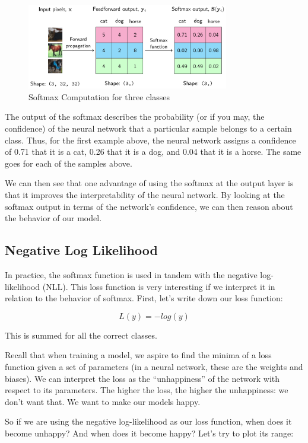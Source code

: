 \documentclass{report}
\begin{document}
\begin{figure}[ht]
	\includegraphics[width=250pt]{9}
	\centering
	\caption{Softmax Computation for three classes}
\end{figure}

The output of the softmax describes the probability (or if you may, the confidence) of the neural network that a particular sample belongs to a certain class. Thus, for the first example above, the neural network assigns a confidence of 0.71 that it is a cat, 0.26 that it is a dog, and 0.04 that it is a horse. The same goes for each of the samples above.

We can then see that one advantage of using the softmax at the output layer is that it improves the interpretability of the neural network. By looking at the softmax output in terms of the network’s confidence, we can then reason about the behavior of our model.

\subsection{Negative Log Likelihood}
In practice, the softmax function is used in tandem with the negative log-likelihood (NLL). This loss function is very interesting if we interpret it in relation to the behavior of softmax. First, let’s write down our loss function:

$$L(y) = -log(y)$$

This is summed for all the correct classes.

Recall that when training a model, we aspire to find the minima of a loss function given a set of parameters (in a neural network, these are the weights and biases). We can interpret the loss as the “unhappiness” of the network with respect to its parameters. The higher the loss, the higher the unhappiness: we don’t want that. We want to make our models happy.

So if we are using the negative log-likelihood as our loss function, when does it become unhappy? And when does it become happy? Let’s try to plot its range:
\end{document}
